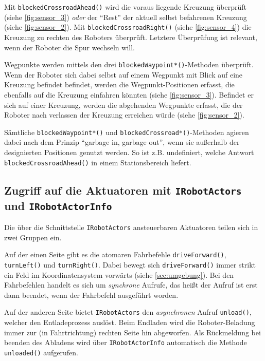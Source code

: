 Mit \texttt{blockedCrossroadAhead()} wird die voraus liegende Kreuzung überprüft (siehe \autoref{fig:sensor_3}) \emph{oder} der \enquote{Rest} der aktuell selbst befahrenen Kreuzung (siehe \autoref{fig:sensor_2}). Mit \texttt{blockedCrossroadRight()} (siehe \autoref{fig:sensor_4}) die Kreuzung zu rechten des Roboters überprüft. Letztere Überprüfung ist relevant, wenn der Roboter die Spur wechseln will.

Wegpunkte werden mittels den drei \texttt{blockedWaypoint*()}-Methoden überprüft.
Wenn der Roboter sich dabei selbst auf einem Wegpunkt mit Blick auf eine Kreuzung befindet befindet, werden die Wegpunkt-Positionen erfasst, die ebenfalls auf die Kreuzung einfahren könnten (siehe \autoref{fig:sensor_3}). Befindet er sich auf einer Kreuzung, werden die abgehenden Wegpunkte erfasst, die der Roboter nach verlassen der Kreuzung erreichen würde (siehe \autoref{fig:sensor_2}).

Sämtliche \texttt{blockedWaypoint*()} und \texttt{blockedCrossroad*()}-Methoden agieren dabei nach dem Prinzip \enquote{garbage in, garbage out}, wenn sie außerhalb der designierten Positionen genutzt werden. So ist z.B. undefiniert, welche Antwort \texttt{blockedCrossroadAhead()} in einem Stationsbereich liefert.







\subsection{Zugriff auf die Aktuatoren mit \texttt{IRobotActors} und \texttt{IRobotActorInfo}}
\label{subsec:actors}

Die über die Schnittstelle \texttt{IRobotActors} ansteuerbaren Aktuatoren teilen sich in zwei Gruppen ein.

Auf der einen Seite gibt es die atomaren Fahrbefehle \texttt{driveForward()}, \texttt{turnLeft()} und \texttt{turnRight()}. Dabei bewegt sich \texttt{driveForward()} immer strikt ein Feld im Koordinatensystem vorwärts (siehe \autoref{sec:umgebung}).
Bei den Fahrbefehlen handelt es sich um \emph{synchrone} Aufrufe, das heißt der Aufruf ist erst dann beendet, wenn der Fahrbefehl ausgeführt worden.

Auf der anderen Seite bietet \texttt{IRobotActors} den \emph{asynchronen} Aufruf \texttt{unload()}, welcher den Entladeprozess auslöst. Beim Endladen wird die Roboter-Beladung immer zur (in Fahrtrichtung) rechten Seite hin abgeworfen.
Als Rückmeldung bei beenden des Abladens wird über \texttt{IRobotActorInfo} automatisch die Methode \texttt{unloaded()} aufgerufen.





